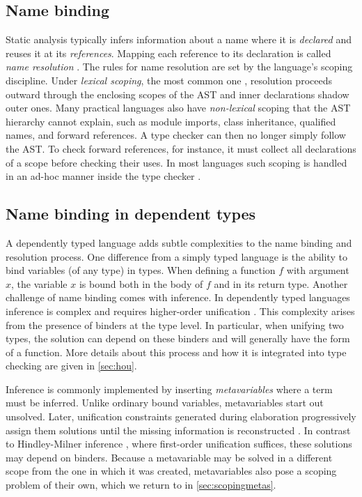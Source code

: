 \subsection{Name binding}
Static analysis typically infers information about a name where it is
\emph{declared} and reuses it at its \emph{references}. Mapping each reference
to its declaration is called \emph{name resolution}
\autocite{4bf44aa1779c4a968c555e1b54e16119}. The rules for name resolution are
set by the language's scoping discipline. Under \emph{lexical scoping}, the most
common one \autocite{scott_programming_2015}, resolution proceeds outward
through the enclosing scopes of the AST and inner declarations shadow outer
ones. Many practical languages also have \emph{non-lexical} scoping that the AST
hierarchy cannot explain, such as module imports, class inheritance, qualified
names, and forward references. A type checker can then no longer simply follow
the AST. To check forward references, for instance, it must collect all
declarations of a scope before checking their uses. In most languages such
scoping is handled in an ad-hoc manner inside the type checker
\autocite{neron_extensible_2015}.

\subsection{Name binding in dependent types}

A dependently typed language adds subtle complexities to the name binding and resolution process. One difference from a simply typed language is the ability to bind variables (of any type) in types. When defining a function $f$ with argument $x$, the variable $x$ is bound both in the body of $f$ and in its return type. Another challenge of name binding comes with inference. In dependently typed languages inference is complex and requires higher-order unification \autocite{mazzoli2016typechecking,demoura2015elaboration,abel_extensions_2018}. This complexity arises from the presence of binders at the type level. In particular, when unifying two types, the solution can depend on these binders and will generally have the form of a function. More details about this process and how it is integrated into type checking are given in \cref{sec:hou}. 

Inference is commonly implemented by inserting \emph{metavariables} where a term
must be inferred. Unlike ordinary bound variables, metavariables start out
unsolved. Later, unification constraints generated during elaboration progressively
assign them solutions until the missing information is reconstructed
\autocite{gundry2010typeinference,dunfield2013complete}. In contrast to
Hindley-Milner inference \autocite{milner1978theory,damas1982principal}, where
first-order unification suffices, these solutions may depend on binders.
Because a metavariable may be solved in a different scope from the one in
which it was created, metavariables also pose a scoping problem of their own,
which we return to in \cref{sec:scopingmetas}.



